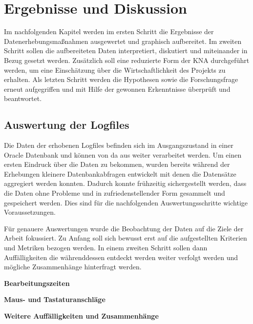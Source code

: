 \section{Ergebnisse und Diskussion}
\label{sec:ergebnisseUndDiskussion}
Im nachfolgenden Kapitel werden im ersten Schritt die Ergebnisse der Datenerhebungsmaßnahmen ausgewertet und graphisch aufbereitet. Im zweiten Schritt sollen die aufbereiteten Daten interpretiert, diskutiert und miteinander in Bezug gesetzt werden. Zusätzlich soll eine reduzierte Form der \gls{KNA} durchgeführt werden, um eine Einschätzung über die Wirtschaftlichkeit des Projekts zu erhalten. Als letzten Schritt werden die Hypothesen sowie die Forschungsfrage erneut aufgegriffen und mit Hilfe der gewonnen Erkenntnisse überprüft und beantwortet.  


\subsection{Auswertung der Logfiles}
\label{sec:auswertungDerLogfiles}
Die Daten der erhobenen Logfiles befinden sich im Ausgangszustand in einer Oracle Datenbank und können von da aus weiter verarbeitet werden. Um einen ersten Eindruck über die Daten zu bekommen, wurden bereits während der Erhebungen kleinere Datenbankabfragen entwickelt mit denen die Datensätze aggregiert werden konnten. Dadurch konnte frühzeitig sichergestellt werden, dass die Daten ohne Probleme und in zufriedenstellender Form gesammelt und gespeichert werden. Dies sind für die nachfolgenden Auswertungsschritte wichtige Voraussetzungen.

Für genauere Auswertungen wurde die Beobachtung der Daten auf die Ziele der Arbeit fokussiert. Zu Anfang soll sich bewusst erst auf die aufgestellten Kriterien und Metriken bezogen werden. In einem zweiten Schritt sollen dann Auffälligkeiten die währenddessen entdeckt werden weiter verfolgt werden und mögliche Zusammenhänge hinterfragt werden.

\textbf{Bearbeitungszeiten}

\textbf{Maus- und Tastaturanschläge}

\textbf{Weitere Auffälligkeiten und Zusammenhänge}

